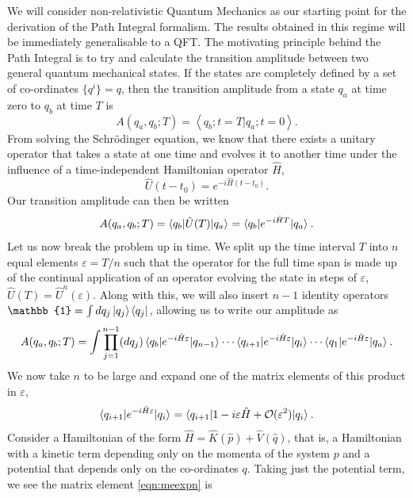 We will consider non-relativistic Quantum Mechanics as our starting point for the derivation of the Path Integral formalism. The results obtained in this regime will be immediately generalisable to a QFT. The motivating principle behind the Path Integral is to try and calculate the transition amplitude between two general quantum mechanical states. If the states are completely defined by a set of co-ordinates $\{q^i\} = q$, then the transition amplitude from a state $q_a$ at time zero to $q_b$ at time $T$ is
\begin{equation}
A(q_a, q_b; T) = \left < q_b; t=T| q_a; t=0 \right >.
\end{equation}
From solving the Schr\"{o}dinger equation, we know that there exists a unitary operator that takes a state at one time and evolves it to another time under the influence of a time-independent Hamiltonian operator $\hat{H}$,
\begin{equation}
\hat{U}(t-t_0) = e^{-i \hat{H}(t-t_0)}.
\end{equation}
Our transition amplitude can then be written
\begin{equation}
A(q_a, q_b; T) = \mathinner{\langle q_b\vert\hat{U}(T)\vert q_a\rangle}_{} = \mathinner{\langle q_b\vert e^{-i \hat{H}T}\vert q_a\rangle}_{}.
\end{equation} 
Let us now break the problem up in time. We split up the time interval $T$ into $n$ equal elements $\varepsilon = T/n$ such that the operator for the full time span is made up of the continual application of an operator evolving the state in steps of $\varepsilon$, $\hat{U}(T) = \hat{U}^n(\varepsilon)$. Along with this, we will also insert $n-1$ identity operators $\mathbb{1} = \int dq_j \ket{q_j} \bra{q_j}$, allowing us to write our amplitude as
\begin{equation}
\label{eqn:generalamp}
A(q_a, q_b;T) = \int \prod_{j=1}^{n-1} (dq_j) \mathinner{\langle q_b\vert e^{-i \hat{H} \varepsilon}\vert q_{n-1}\rangle}_{} \cdots \mathinner{\langle q_{i+1}\vert e^{-i \hat{H} \varepsilon}\vert q_{i}\rangle}_{} \cdots \mathinner{\langle q_1\vert e^{-i \hat{H} \varepsilon}\vert q_a\rangle}_{}.\end{equation}
We now take $n$ to be large and expand one of the matrix elements of this product in $\varepsilon$,
\begin{equation}
\label{eqn:meexpn}
\mathinner{\langle q_{i+1}\vert e^{-i \hat{H} \varepsilon}\vert q_i\rangle}_{} = \mathinner{\langle q_{i+1}\vert1 - i \varepsilon \hat{H} + \mathcal{O}(\varepsilon^2)\vert q_i\rangle}_{}.
\end{equation}
Consider a Hamiltonian of the form $\hat{H} = \hat{K}(\hat{p}) + \hat{V}(\hat{q})$, that is, a Hamiltonian with a kinetic term depending only on the momenta of the system $p$ and a potential that depends only on the co-ordinates $q$. Taking just the potential term, we see the matrix element \ref{eqn:meexpn} is
